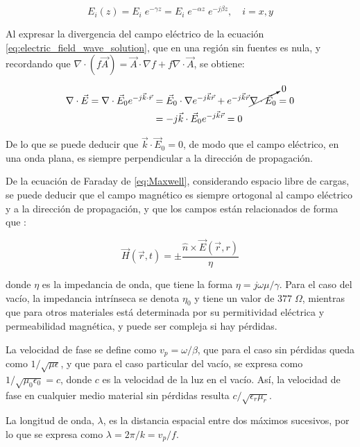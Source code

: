 \begin{equation}
E_i(z) = E_i \; e^{-\gamma z} = E_i \; e^{-\alpha z} \; e^{-j \beta z}, \quad i=x,y \nonumber
\end{equation}

Al expresar la divergencia del campo eléctrico de la ecuación \ref{eq:electric_field_wave_solution}, que en una región sin fuentes es nula, y recordando que $\nabla \cdot (f \vec{A}) = \vec{A} \cdot \nabla f + f \nabla \cdot \vec{A}$, se obtiene:


\begin{align}
	\nabla \cdot \vec{E} = \nabla \cdot \vec{E}_0 e^{-j\vec{k} \cdot \vec{r}} & = \vec{E}_0 \cdot \nabla e^{-j \vec{k} \vec{r}} + e^{-j \vec{k} \vec{r}} \cancelto{0}{\nabla \cdot \vec{E}_0} = 0 \nonumber \\
	& = -j \vec{k} \cdot \vec{E}_0 e^{-j \vec{k} \vec{r}} = 0
\end{align}

De lo que se puede deducir que $\vec{k} \cdot \vec{E}_0 = 0$, de modo que el campo eléctrico, en una onda plana, es siempre perpendicular a la dirección de propagación.

De la ecuación de Faraday de \ref{eq:Maxwell}, considerando espacio libre de cargas, se puede deducir que el campo magnético es siempre ortogonal al campo eléctrico y a la dirección de propagación, y que los campos están relacionados de forma que \cite{Fernandez:Electromag}:

\begin{equation}
	\vec{H}(\vec{r},t) = \pm \frac{\hat{n} \times \vec{E}(\vec{r},r)}{\eta}
\end{equation}

donde $\eta$ es la impedancia de onda, que tiene la forma $\eta = j \omega \mu / \gamma$. Para el caso del vacío, la impedancia intrínseca se denota $\eta_0$ y tiene un valor de $377\; \Omega$, mientras que para otros materiales está determinada por su permitividad eléctrica y permeabilidad magnética, y puede ser compleja si hay pérdidas.

La velocidad de fase se define como $v_p=\omega/\beta$, que para el caso sin pérdidas queda como $1/\sqrt{\mu \epsilon}$, y que para el caso particular del vacío, se expresa como $1/\sqrt{\mu_0 \epsilon_0} = c$, donde $c$ es la velocidad de la luz en el vacío. Así, la velocidad de fase en cualquier medio material sin pérdidas resulta $c/\sqrt{\epsilon_r \mu_r}$.

La longitud de onda, $\lambda$, es la distancia espacial entre dos máximos sucesivos, por lo que se expresa como $\lambda = 2\pi / k = v_p/f$.

